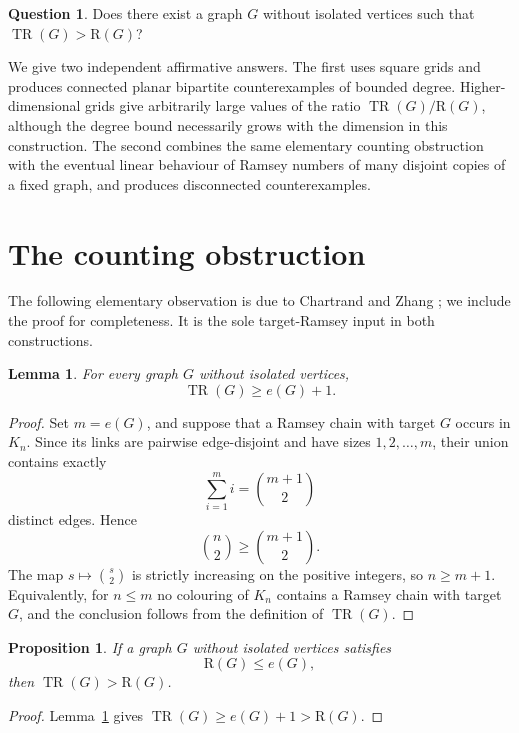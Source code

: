 \documentclass[11pt,reqno]{amsart}
\theoremstyle{plain}
\newtheorem{lemma}[theorem]{Lemma}
\newtheorem{proposition}[theorem]{Proposition}
\theoremstyle{definition}
\newtheorem{question}{Question}
\theoremstyle{remark}
\DeclareMathOperator{\TR}{TR}
\newcommand{\R}{\mathrm{R}}
\begin{document}
\begin{question}
Does there exist a graph $G$ without isolated vertices such that $\TR(G) > \R(G)$?
\end{question}

We give two independent affirmative answers. The first uses square grids and produces connected planar bipartite counterexamples of bounded degree. Higher-dimensional grids give arbitrarily large values of the ratio $\TR(G)/\R(G)$, although the degree bound necessarily grows with the dimension in this construction. The second combines the same elementary counting obstruction with the eventual linear behaviour of Ramsey numbers of many disjoint copies of a fixed graph, and produces disconnected counterexamples.

\section{The counting obstruction}

The following elementary observation is due to Chartrand and Zhang \cite{CZ1,CZ2}; we include the proof for completeness. It is the sole target-Ramsey input in both constructions.

\begin{lemma}\label{lem:count}
For every graph $G$ without isolated vertices,
\[
\TR(G) \geq e(G) + 1.
\]
\end{lemma}

\begin{proof}
Set $m = e(G)$, and suppose that a Ramsey chain with target $G$ occurs in $K_n$. Since its links are pairwise edge-disjoint and have sizes $1, 2, \ldots, m$, their union contains exactly
\[
\sum_{i=1}^{m} i = \binom{m+1}{2}
\]
distinct edges. Hence
\[
\binom{n}{2} \geq \binom{m+1}{2}.
\]
The map $s \mapsto \binom{s}{2}$ is strictly increasing on the positive integers, so $n \geq m+1$. Equivalently, for $n \leq m$ no colouring of $K_n$ contains a Ramsey chain with target $G$, and the conclusion follows from the definition of $\TR(G)$.
\end{proof}

\begin{proposition}\label{prop:criterion}
If a graph $G$ without isolated vertices satisfies
\[
\R(G) \leq e(G),
\]
then $\TR(G) > \R(G)$.
\end{proposition}

\begin{proof}
Lemma~\ref{lem:count} gives $\TR(G) \geq e(G) + 1 > \R(G)$.
\end{proof}
\end{document}
